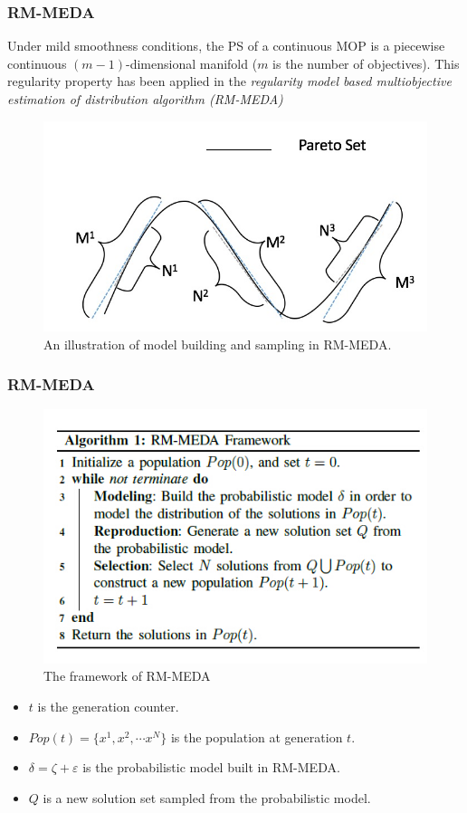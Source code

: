 \documentclass[xcolor=dvipsnames]{beamer}
\begin{document}
    \begin{frame}
    \frametitle{RM-MEDA}
    Under mild smoothness conditions, the PS of a continuous MOP is a piecewise continuous $(m-1)$-dimensional manifold ($m$ is the number of objectives). This regularity property has been applied in the \emph{regularity model based multiobjective estimation of distribution algorithm (RM-MEDA)}
    \begin{figure}
    \centering
    \includegraphics[width=0.5\columnwidth]{pareto.png}
    \caption{An illustration of model building and sampling in RM-MEDA.}
    \end{figure}
    \end{frame}

    \begin{frame}
    \frametitle{RM-MEDA}
    \begin{figure}
    \centering
    \includegraphics[width=0.5\columnwidth]{alg1.jpg}
    \caption{The framework of RM-MEDA}

    \end{figure}
    \begin{itemize}
    \item $t$ is the generation counter.
    \item $Pop(t)=\{x^1,x^2, \cdots x^N\}$ is the population at generation $t$.
    \item $\delta = \zeta + \varepsilon$ is the probabilistic model built in RM-MEDA.
    \item $Q$ is a new solution set sampled from the probabilistic model.
    \end{itemize}
    \end{frame}
\end{document}
